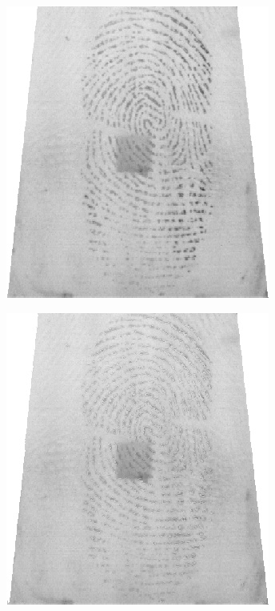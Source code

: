 \documentclass{beamer}
\begin{document}
{\begin{figure}[!ht]
\begin{subfigure}[ht]{0.15\textwidth}
        \end{subfigure}
    \end{figure}
    \begin{figure}[!ht]
        \centering
        \begin{subfigure}[ht]{0.15\textwidth}
            \includegraphics[width=\textwidth]{fingerprints/2004Db2a/1_2_src.jpg}
        \end{subfigure}
        \qquad
        \begin{subfigure}[ht]{0.15\textwidth}
            \includegraphics[width=\textwidth]{fingerprints/2004Db2a/1_2_background.jpg}

\end{subfigure}
\end{figure}}
\end{document}
